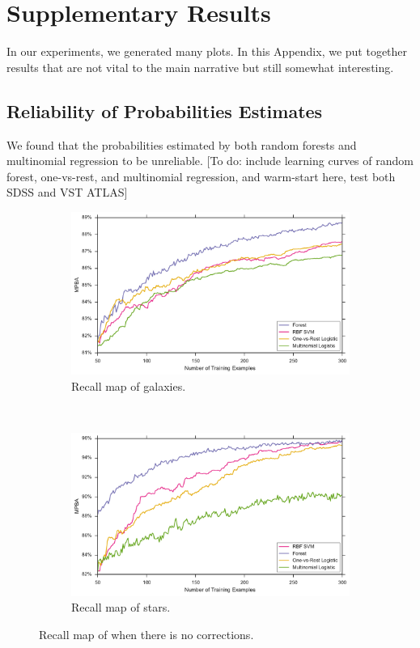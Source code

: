\chapter{Supplementary Results}
\label{cha:supp}

In our experiments, we generated many plots. In this Appendix, we put together results
that are not vital to the main narrative but still somewhat interesting.

\section{Reliability of Probabilities Estimates}
\label{sec:forest_prob}

We found that the probabilities estimated by both random forests and multinomial regression
to be unreliable. [To do: include learning curves of random forest, one-vs-rest, and
multinomial regression, and warm-start here, test both SDSS and VST ATLAS]

\begin{figure}[p]
	\centering
	\begin{subfigure}{\textwidth}
		\centering
		\includegraphics[width=\textwidth]{figures/appendix/sdss_forest_multinom}
		\caption{Recall map of galaxies.}
		\label{fig:sdss_forest_multinom}
	\end{subfigure}\\
	\begin{subfigure}{\textwidth}
		\centering
		\includegraphics[width=\linewidth]{figures/appendix/vstatlas_forest_multinom}
		\caption{Recall map of stars.}
		\label{fig:vstatlas_forest_multinom}
	\end{subfigure}
	\caption{Recall map of when there is no corrections.}
	\label{fig:forest_multinom}
\end{figure}


